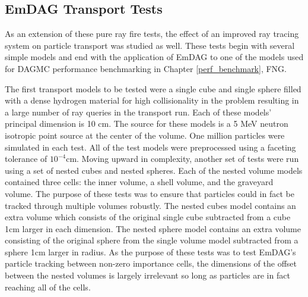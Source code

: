 \subsection{EmDAG Transport Tests}
\label{subsec:emdag_transport}

As an extension of these pure ray fire tests, the effect of an improved ray
tracing system on particle transport was studied as well. These tests begin with
several simple models and end with the application of EmDAG to one of the models
used for DAGMC performance benchmarking in Chapter \ref{perf_benchmark}, FNG.

The first transport models to be tested were a single cube and single sphere
filled with a dense hydrogen material for high collisionality in the problem
resulting in a large number of ray queries in the transport run. Each of these
models' principal dimension is 10 cm. The source for these models is a 5 MeV
neutron isotropic point source at the center of the volume. One million
particles were simulated in each test. All of the test models were preprocessed
using a faceting tolerance of $10^{-4}$cm. Moving upward in complexity, another
set of tests were run using a set of nested cubes and nested spheres. Each of
the nested volume models contained three cells: the inner volume, a shell
volume, and the graveyard volume. The purpose of these tests was to ensure that
particles could in fact be tracked through multiple volumes robustly. The nested
cubes model contains an extra volume which consists of the original single cube
subtracted from a cube 1cm larger in each dimension. The nested sphere model
contains an extra volume consisting of the original sphere from the single
volume model subtracted from a sphere 1cm larger in radius. As the purpose of
these tests was to test EmDAG's particle tracking between non-zero importance
cells, the dimensions of the offset between the nested volumes is largely
irrelevant so long as particles are in fact reaching all of the cells.

